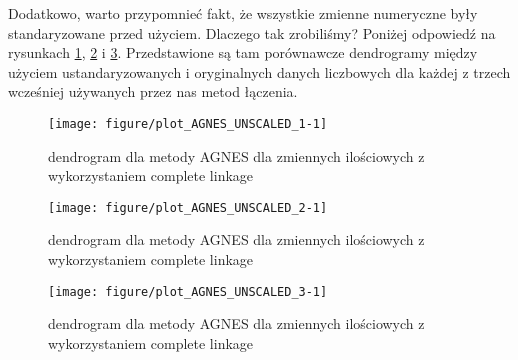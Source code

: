 \documentclass[12pt, a4paper]{article}\usepackage[]{graphicx}\usepackage[]{xcolor}
\makeatletter
\def\maxwidth{ %
  \ifdim\Gin@nat@width>\linewidth
    \linewidth
  \else
    \Gin@nat@width
  \fi
}
\newenvironment{knitrout}{}{} %
\makeatother
\begin{document}
\par Dodatkowo, warto przypomnieć fakt, że wszystkie zmienne numeryczne były standaryzowane przed użyciem. Dlaczego tak zrobiliśmy? Poniżej odpowiedź na rysunkach \ref{fig:plot_AGNES_UNSCALED_1}, \ref{fig:plot_AGNES_UNSCALED_2} i \ref{fig:plot_AGNES_UNSCALED_3}. Przedstawione są tam porównawcze dendrogramy między użyciem ustandaryzowanych i oryginalnych danych liczbowych dla każdej z trzech wcześniej używanych przez nas metod łączenia.


\begin{knitrout}
\color{fgcolor}\begin{figure}[H]

{\centering \texttt{[image: figure/plot\_AGNES\_UNSCALED\_1-1]} 

}

\caption[dendrogram dla metody AGNES dla zmiennych ilościowych z wykorzystaniem complete linkage]{dendrogram dla metody AGNES dla zmiennych ilościowych z wykorzystaniem complete linkage}\label{fig:plot_AGNES_UNSCALED_1}
\end{figure}

\end{knitrout}

\begin{knitrout}
\color{fgcolor}\begin{figure}[H]

{\centering \texttt{[image: figure/plot\_AGNES\_UNSCALED\_2-1]} 

}

\caption[dendrogram dla metody AGNES dla zmiennych ilościowych z wykorzystaniem complete linkage]{dendrogram dla metody AGNES dla zmiennych ilościowych z wykorzystaniem complete linkage}\label{fig:plot_AGNES_UNSCALED_2}
\end{figure}

\end{knitrout}

\begin{knitrout}
\color{fgcolor}\begin{figure}[H]

{\centering \texttt{[image: figure/plot\_AGNES\_UNSCALED\_3-1]} 

}

\caption[dendrogram dla metody AGNES dla zmiennych ilościowych z wykorzystaniem complete linkage]{dendrogram dla metody AGNES dla zmiennych ilościowych z wykorzystaniem complete linkage}\label{fig:plot_AGNES_UNSCALED_3}
\end{figure}

\end{knitrout}
\end{document}
